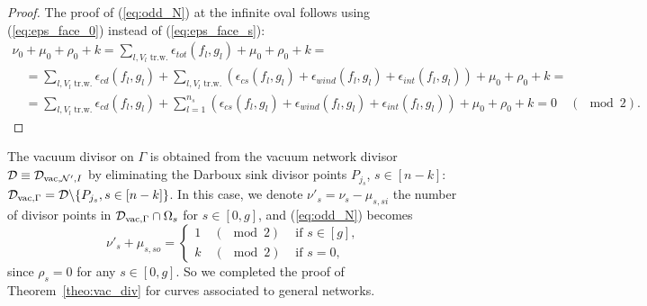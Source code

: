 \documentclass[11pt]{amsart}
\theoremstyle{plain}
\numberwithin{equation}{section}
\def \DVG {{\mathcal D}_{\textup{\scriptsize vac},\Gamma}}
\begin{document}
\begin{proof}
The proof of (\ref{eq:odd_N}) at the infinite oval follows using  (\ref{eq:eps_face_0}) instead of (\ref{eq:eps_face_s}):
\begin{equation}\label{eq:mainformula_0}
\begin{array}{l}
\nu_{0}+ \mu_{0} + \rho_0 + k \displaystyle = \sum_{l, V_l \mbox{ tr.w.}} \epsilon_{tot} (f_l,g_l) + \mu_{0} + \rho_0   + k = \\
\quad \displaystyle=  \sum_{l, V_l \mbox{ tr.w.}} \epsilon_{cd} (f_l,g_l) +  \sum_{l, V_l \mbox{ tr.w.}} \left( \epsilon_{cs} (f_l,g_l) + \epsilon_{wind} (f_l,g_l) +
\epsilon_{int} (f_l,g_l) \right)+ \mu_{0} + \rho_0   +k  = \\
\quad\displaystyle=\sum_{l, V_l \mbox{ tr.w.}} \epsilon_{cd} (f_l,g_l) +  \sum_{l=1}^{n_s} \left( \epsilon_{cs} (f_l,g_l) + \epsilon_{wind} (f_l,g_l) +\epsilon_{int} (f_l,g_l) \right)+ \mu_{0}+ \rho_0 +k =0 \quad
(\!\!\!\!\!\!\mod 2).
\end{array}
\end{equation}
\end{proof}

The vacuum divisor on $\Gamma$ is obtained from the vacuum network divisor ${\mathcal D}\equiv 
{\mathcal D}_{\textup{\scriptsize vac}, {\mathcal N}^{\prime}, I}$ by eliminating the Darboux sink divisor points $P_{j_s}$, $s\in[n-k]$: $\DVG={\mathcal D}\backslash \{P_{j_s},s\in[n-k]\}$. In this case, we denote $\nu'_s=\nu_s- \mu_{s,si}$ the number of divisor points in $\DVG\cap\Omega_s$ for 
$s\in[0,g]$, and  (\ref{eq:odd_N}) becomes
\begin{equation}\label{eq:odd_N_2}
\nu'_{s}+ \mu_{s,so} = \left\{ \begin{array}{ll} 1 \quad
(\!\!\!\!\!\!\mod 2) & \mbox{ if } s\in [g],\\
k \quad
(\!\!\!\!\!\!\mod 2)& \mbox{ if } s=0,
\end{array}
\right.
\end{equation}
since $\rho_s=0$ for any $s\in[0,g]$. 
So we completed the proof of Theorem~\ref{theo:vac_div} for curves associated to general networks.
\end{document}
